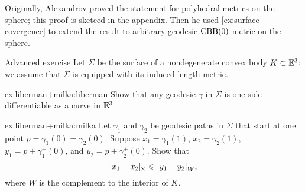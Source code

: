 Originally, Alexandrov proved the statement for polyhedral metrics on the sphere; this proof is sketced in the appendix.
Then he used \ref{ex:surface-covergence} to extend the result to arbitrary geodesic $\mathrm{CBB}(0)$ metric on the sphere.

\begin{thm}{Advanced exercise}\label{ex:liberman+milka}
Let $\Sigma$ be the surface of a nondegenerate convex body $K\subset\mathbb{E}^3$;
we assume that $\Sigma$ is equipped with its induced length metric.

\begin{subthm}{ex:liberman+milka:liberman}
Show that any geodesic $\gamma$ in $\Sigma$ is one-side differentiable as a curve in $\mathbb{E}^3$ 
\end{subthm}

\begin{subthm}{ex:liberman+milka:milka}
Let $\gamma_1$ and $\gamma_2$ be geodesic paths in $\Sigma$ that start at one point $p=\gamma_1(0)=\gamma_2(0)$.
Suppose $x_1=\gamma_1(1)$, $x_2=\gamma_2(1)$, $y_1=p+\gamma_1^+(0)$, and $y_2=p+\gamma_2^+(0)$.
Show that 
\[\dist{x_1}{x_2}{\Sigma}\le \dist{y_1}{y_2}{W},\]
where $W$ is the complement to the interior of $K$.
\end{subthm}

\end{thm}

